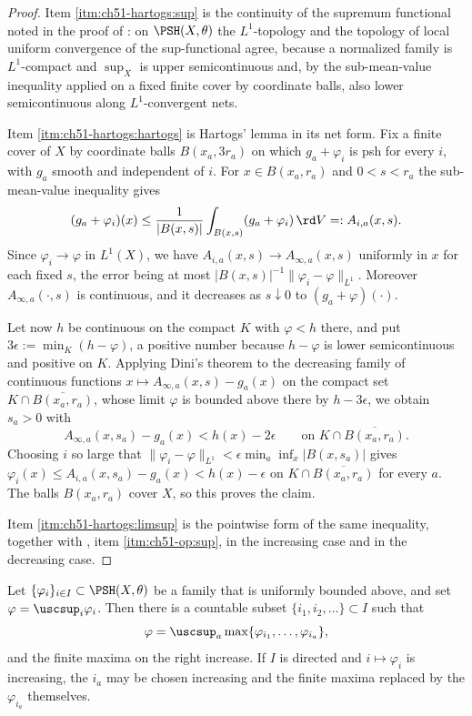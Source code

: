 \begin{proof}
Item \cref{itm:ch51-hartogs:sup} is the continuity of the supremum
functional noted in the proof of : on
\(\PSH(X,\theta)\) the \(L^1\)-topology and the topology of local uniform
convergence of the sup-functional agree, because a normalized family is
\(L^1\)-compact and \(\sup_X\) is upper semicontinuous and, by the
sub-mean-value inequality applied on a fixed finite cover by coordinate
balls, also lower semicontinuous along \(L^1\)-convergent nets.

Item \cref{itm:ch51-hartogs:hartogs} is Hartogs' lemma in its net form.
Fix a finite cover of \(X\) by coordinate balls \(B(x_a,3r_a)\) on which
\(g_a+\varphi_i\) is psh for every \(i\), with \(g_a\) smooth and
independent of \(i\).  For \(x\in B(x_a,r_a)\) and \(0<s<r_a\) the
sub-mean-value inequality gives
\[
 (g_a+\varphi_i)(x)
 \leq\frac{1}{|B(x,s)|}\int_{B(x,s)}(g_a+\varphi_i)\,\rd V
 =:A_{i,a}(x,s).
\]
Since \(\varphi_i\to\varphi\) in \(L^1(X)\), we have
\(A_{i,a}(x,s)\to A_{\infty,a}(x,s)\) uniformly in \(x\) for each fixed
\(s\), the error being at most
\(|B(x,s)|^{-1}\|\varphi_i-\varphi\|_{L^1}\).  Moreover
\(A_{\infty,a}(\cdot,s)\) is continuous, and it decreases as
\(s\downarrow0\) to \((g_a+\varphi)(\cdot)\).

Let now \(h\) be continuous on the compact \(K\) with \(\varphi<h\) there,
and put \(3\epsilon:=\min_K(h-\varphi)\), a positive number because
\(h-\varphi\) is lower semicontinuous and positive on \(K\).  Applying
Dini's theorem to the decreasing family of continuous functions
\(x\mapsto A_{\infty,a}(x,s)-g_a(x)\) on the compact set
\(K\cap\overline{B(x_a,r_a)}\), whose limit \(\varphi\) is bounded above
there by \(h-3\epsilon\), we obtain \(s_a>0\) with
\[
 A_{\infty,a}(x,s_a)-g_a(x)<h(x)-2\epsilon
 \qquad\text{on }K\cap\overline{B(x_a,r_a)} .
\]
Choosing \(i\) so large that
\(\|\varphi_i-\varphi\|_{L^1}<\epsilon\min_a\inf_x|B(x,s_a)|\) gives
\(\varphi_i(x)\leq A_{i,a}(x,s_a)-g_a(x)<h(x)-\epsilon\) on
\(K\cap\overline{B(x_a,r_a)}\) for every \(a\).  The balls
\(B(x_a,r_a)\) cover \(X\), so this proves the claim.

Item \cref{itm:ch51-hartogs:limsup} is the pointwise form of the same
inequality, together with , item
\cref{itm:ch51-op:sup}, in the increasing case and
 in the decreasing case.
\end{proof}

\begin{corollary}\label{cor:ch51-choquet}
Let \(\{\varphi_i\}_{i\in I}\subset\PSH(X,\theta)\) be a family that is
uniformly bounded above, and set \(\varphi=\uscsup_i\varphi_i\).  Then
there is a countable subset \(\{i_1,i_2,\ldots\}\subset I\) such that
\[
 \varphi=\uscsup_a\max\{\varphi_{i_1},\ldots,\varphi_{i_a}\},
\]
and the finite maxima on the right increase.  If \(I\) is directed and
\(i\mapsto\varphi_i\) is increasing, the \(i_a\) may be chosen increasing
and the finite maxima replaced by the \(\varphi_{i_a}\) themselves.
\end{corollary}


